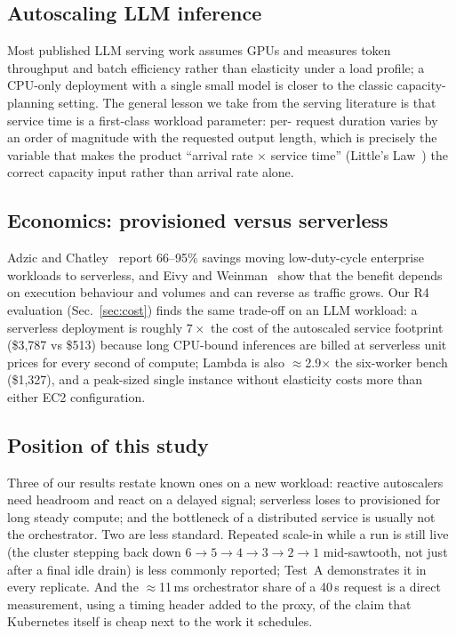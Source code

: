 \documentclass[conference]{IEEEtran}
\begin{document}
\subsection{Autoscaling LLM inference}

Most published LLM serving work assumes GPUs and measures token throughput
and batch efficiency rather than elasticity under a load profile; a CPU-only
deployment with a single small model is closer to the classic
capacity-planning setting. The general lesson we take from the serving
literature is that service time is a first-class workload parameter: per-
request duration varies by an order of magnitude with the requested output
length, which is precisely the variable that makes the product
``arrival rate $\times$ service time'' (Little's Law~\cite{little}) the
correct capacity input rather than arrival rate alone.

\subsection{Economics: provisioned versus serverless}

Adzic and Chatley~\cite{adzic2017} report 66--95\% savings moving
low-duty-cycle enterprise workloads to serverless, and Eivy and
Weinman~\cite{eivy2017} show that the benefit depends on execution behaviour
and volumes and can reverse as traffic grows. Our R4 evaluation
(Sec.~\ref{sec:cost}) finds the same trade-off on an LLM workload: a
serverless deployment is roughly $7\times$ the cost of the autoscaled
service footprint (\$3{,}787 vs \$513) because long CPU-bound inferences are
billed at serverless unit prices for every second of compute; Lambda is also
$\approx$2.9$\times$ the six-worker bench (\$1{,}327), and a peak-sized single
instance without elasticity costs more than either EC2 configuration.

\subsection{Position of this study}

Three of our results restate known ones on a new workload: reactive
autoscalers need headroom and react on a delayed signal; serverless loses to
provisioned for long steady compute; and the bottleneck of a distributed
service is usually not the orchestrator. Two are less standard. Repeated
scale-in while a run is still live (the cluster stepping back down
$6{\to}5{\to}4{\to}3{\to}2{\to}1$ mid-sawtooth, not just after a final idle
drain) is less commonly reported; Test~A demonstrates it in every
replicate. And the $\approx$11\,ms orchestrator share of a 40\,s request is a
direct measurement, using a timing header added to the proxy, of the claim
that Kubernetes itself is cheap next to the work it schedules.
\end{document}
